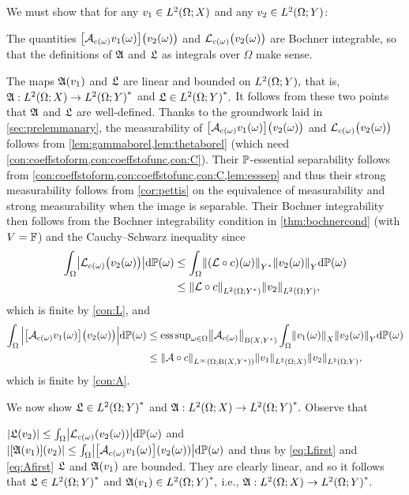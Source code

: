 \label{page:lemsvarwelldefinedproof}
We must show that for any $\vo \in \LtOX$ and any $\vt \in \LtOY$:
\bit
\item The quantities $\big[\Acomega \vo(\omega)\big]\big(\vt(\omega)\big)$ and $\Lcomega\big(\vt(\omega)\big)$ are Bochner integrable, so that the definitions of $\mathfrak{A}$ and $\mathfrak{L}$ as integrals over $\Omega$ make sense.
\item The maps $\mathfrak{A}(v_{1})$ and $\mathfrak{L}$ are linear and bounded on $\LtOY,$ that is, $\SA:\LtOX\rightarrow\LtOYas$ and $\SL \in \LtOYas.$
\eit
It follows from these two points that $\mathfrak{A}$ and $\mathfrak{L}$ are well-defined.
Thanks to the groundwork laid in \cref{sec:prelemmanary}, the measurability of $\big[\Acomega \vo(\omega)\big]\big(\vt(\omega)\big)$ and $\Lcomega\big(\vt(\omega)\big)$  follows from \cref{lem:gammaborel,lem:thetaborel} (which need \cref{con:coeffstoform,con:coeffstofunc,con:C}).
Their $\mathbb P$-essential separability follows from \cref{con:coeffstoform,con:coeffstofunc,con:C,lem:esssep} and thus their strong measurability follows from \cref{cor:pettis} on the equivalence of measurability and strong measurability when the image is separable. Their Bochner integrability then follows from the Bochner integrability condition in \cref{thm:bochnercond} (with $V=\mathbb F$) and the Cauchy--Schwarz inequality since
\begin{align}
\int_\Omega \abs{\Lcomega\big(\vt(\omega)\big)}\dd\PP(\omega)&\leq \int_\Omega \NYs{\mleft(\rhs\circ\coeff\mright)(\omega)}\NY{\vt(\omega)}\dd\PP(\omega)\nonumber\\
&\leq \NLtOYs{\rhs\circ\coeff}\NLtOY{\vt},\label{eq:Lfirst}
\end{align}
which is finite by \cref{con:L}, and 
\begin{align}
\int_\Omega \Big|\big[\Acomega \vo(\omega)\big]\big(\vt(\omega)\big)\Big|\dd\PP(\omega) %
&\leq \esssup_{\omega \in \Omega} \Nhomspace{\Acomega} \int_\Omega \NX{\vo(\omega)}\NY{\vt(\omega)}\dd\PP(\omega)\nonumber\\
&\leq \NLiOhomspace{\toform\circ\coeff}\NLtOX{\vo}\NLtOY{\vt},\label{eq:Afirst}
\end{align}
which is finite by \cref{con:A}.

We now show $\SL\in  \LtOYas$ and $\SA:\LtOX \rightarrow \LtOYas.$ Observe that 

\noindent $\abs{\SL(\vt)} \leq \int_\Omega \abs{\Lcomega\mleft(\vt(\omega)\mright)}\dd\PP(\omega)$ and $\abs{\mleft[\SA \mleft(\vo\mright)\mright](\vt)} \leq \int_\Omega \abs{\mleft[\Acomega \vo(\omega)\mright]\mleft(\vt(\omega)\mright)}\dd\PP(\omega)$ and thus by \eqref{eq:Lfirst} and \eqref{eq:Afirst} $\mathfrak{L}$ and $\mathfrak{A}(v_{1})$ are bounded. They are clearly linear, and so it follows that $\SL \in \LtOYas$ and $\SA(\vo)\in \LtOYas,$ i.e., $\SA:\LtOX \rightarrow \LtOYas.$
\epf

